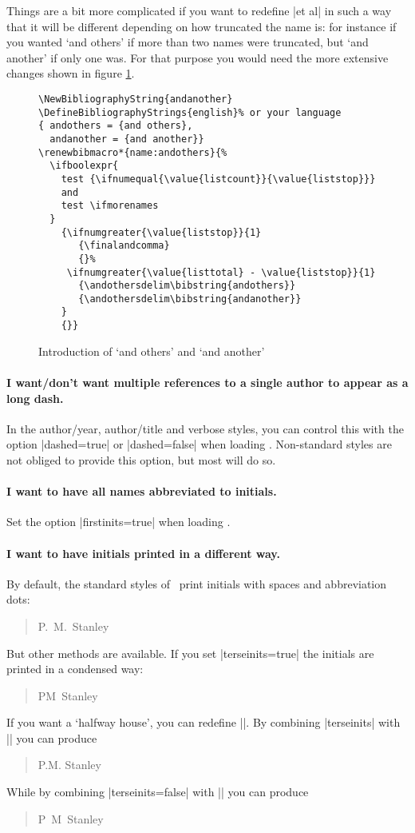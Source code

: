 Things are a bit more complicated if you want to redefine |et al| in such a way that it will be different depending on how truncated the name is: for instance if you wanted `and others' if more than two names were truncated, but `and another' if only one was. For that purpose you would need the more extensive changes shown in figure \ref{andothers}.
\begin{figure}
\begin{Verbatim}[frame=single]
\NewBibliographyString{andanother}
\DefineBibliographyStrings{english}% or your language
{ andothers = {and others},
  andanother = {and another}}
\renewbibmacro*{name:andothers}{%
  \ifboolexpr{
    test {\ifnumequal{\value{listcount}}{\value{liststop}}}
    and
    test \ifmorenames
  }
    {\ifnumgreater{\value{liststop}}{1}
       {\finalandcomma}
       {}%
     \ifnumgreater{\value{listtotal} - \value{liststop}}{1}
       {\andothersdelim\bibstring{andothers}}
       {\andothersdelim\bibstring{andanother}}
    }
    {}}
\end{Verbatim}
\caption{Introduction of `and others' and `and another'\label{andothers}}
\end{figure}

\paragraph{I want/don't want multiple references to a single author to appear as a long dash.} In the author/year, author/title and verbose styles, you can control this with the option |dashed=true| or |dashed=false| when loading \biblatex. Non-standard styles are not obliged to provide this option, but most will do so.

\paragraph{I want to have all names abbreviated to initials.} Set the option |firstinits=true| when loading \biblatex.

\paragraph{I want to have initials printed in a different way.} By default, the standard styles of \biblatex\ print initials with spaces and abbreviation dots:
\begin{quote}
P.~M.~Stanley
\end{quote}
But other methods are available. If you set |terseinits=true| the initials are printed in a condensed way:
\begin{quote}
PM~Stanley
\end{quote}
If you want a `halfway house', you can redefine |\bibinitperiod|. By combining |terseinits| with |\renewcommand{\bibinitperiod}{\adddot}| you can produce
\begin{quote}
P.M. Stanley
\end{quote}
While by combining |terseinits=false| with |\renewcommand{\bibinitperiod}{}| you can produce
\begin{quote}
P~M~Stanley
\end{quote}

